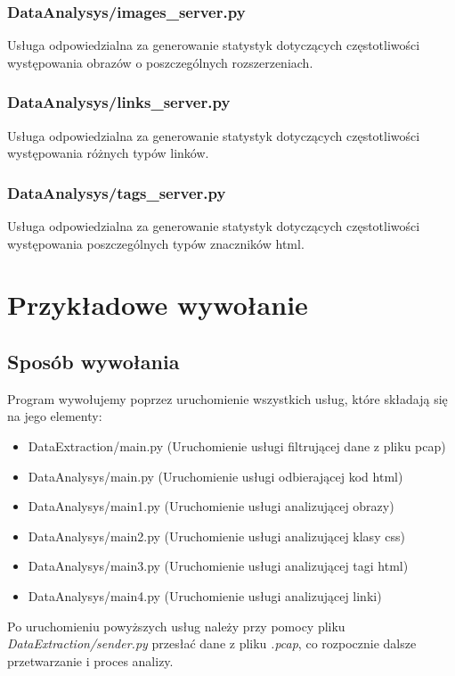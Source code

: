 \documentclass[12pt]{article}
\begin{document}
\subsubsection{DataAnalysys/images\_server.py} 
Usługa odpowiedzialna za generowanie statystyk dotyczących częstotliwości występowania obrazów o poszczególnych rozszerzeniach.

\subsubsection{DataAnalysys/links\_server.py} 
Usługa odpowiedzialna za generowanie statystyk dotyczących częstotliwości występowania różnych typów linków.

\subsubsection{DataAnalysys/tags\_server.py} 
Usługa odpowiedzialna za generowanie statystyk dotyczących częstotliwości występowania poszczególnych typów znaczników html.


\section{Przykładowe wywołanie}
\subsection{Sposób wywołania}
Program wywołujemy poprzez uruchomienie wszystkich usług, które składają się na jego elementy:
\begin{itemize}
\item DataExtraction/main.py (Uruchomienie usługi filtrującej dane z pliku pcap)
\item DataAnalysys/main.py (Uruchomienie usługi odbierającej kod html)
\item DataAnalysys/main1.py (Uruchomienie usługi analizującej obrazy)
\item DataAnalysys/main2.py (Uruchomienie usługi analizującej klasy css)
\item DataAnalysys/main3.py (Uruchomienie usługi analizującej tagi html)
\item DataAnalysys/main4.py (Uruchomienie usługi analizującej linki)
\end{itemize}

Po uruchomieniu powyższych usług należy przy pomocy pliku \emph{DataExtraction/sender.py} przesłać dane z pliku \emph{.pcap}, co rozpocznie dalsze przetwarzanie i proces analizy. 
\end{document}
